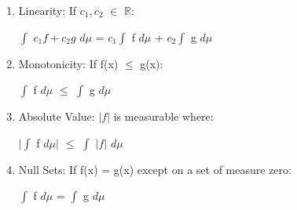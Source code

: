     \begin{enumerate}[label=(\alph*), leftmargin=2cm, itemsep=0.1cm]
        \item {\color{lblue} Linearity}:
            If $c_1,c_2$ $\in$ $\mathbb{R}$:

            \hspace{0.5cm}
            $\int$ $c_1f + c_2g$ $d\mu$
            = $c_1 \int$ f $d\mu$ + $c_2 \int$ g $d\mu$

        \item {\color{lblue} Monotonicity}:
            If f(x) $\leq$ g(x):

            \hspace{0.5cm}
            $\int$ f $d\mu$ $\leq$ $\int$ g $d\mu$

        \item {\color{lblue} Absolute Value}:
            $|f|$ is measurable where:

            \hspace{0.5cm}
            $|\int$ f $d\mu|$
            $\leq$ $\int$ $|f|$ $d\mu$

        \item {\color{lblue} Null Sets}:
            If f(x) = g(x) except on a set of measure zero:

            \hspace{0.5cm}
            $\int$ f $d\mu$ = $\int$ g $d\mu$
    \end{enumerate}

